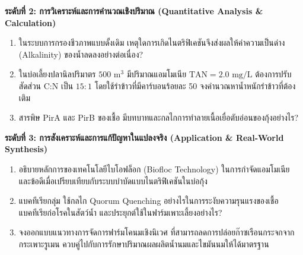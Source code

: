 \noindent \textbf{ระดับที่ 2: การวิเคราะห์และการคำนวณเชิงปริมาณ (Quantitative Analysis \& Calculation)}
\begin{enumerate}[resume]
    \item ในระบบการกรองชีวภาพแบบดั้งเดิม เหตุใดการเกิดไนตริฟิเคชันจึงส่งผลให้ค่าความเป็นด่าง (Alkalinity) ของน้ำลดลงอย่างต่อเนื่อง?
    \item ในบ่อเลี้ยงปลานิลปริมาตร $500\text{ m}^3$ มีปริมาณแอมโมเนีย $\text{TAN} = 2.0\text{ mg/L}$ ต้องการปรับสัดส่วน C:N เป็น $15:1$ โดยใช้รำข้าวที่มีคาร์บอนร้อยละ 50 จงคำนวณหาน้ำหนักรำข้าวที่ต้องเติม
    \item สารพิษ PirA และ PirB ของเชื้อ  มีบทบาทและกลไกการทำลายเนื้อเยื่อตับอ่อนของกุ้งอย่างไร?
\end{enumerate}

\noindent \textbf{ระดับที่ 3: การสังเคราะห์และการแก้ปัญหาในแปลงจริง (Application \& Real-World Synthesis)}
\begin{enumerate}[resume]
    \item อธิบายหลักการของเทคโนโลยีไบโอฟล็อก (Biofloc Technology) ในการกำจัดแอมโมเนีย และข้อดีเมื่อเปรียบเทียบกับระบบบำบัดแบบไนตริฟิเคชันในบ่อกุ้ง
    \item แบคทีเรียกลุ่ม  ใช้กลไก Quorum Quenching อย่างไรในการระงับความรุนแรงของเชื้อแบคทีเรียก่อโรคในสัตว์น้ำ และประยุกต์ใช้ในฟาร์มเพาะเลี้ยงอย่างไร?
    \item จงออกแบบแนวทางการจัดการฟาร์มโคนมเชิงนิเวศ ที่สามารถลดการปล่อยก๊าซเรือนกระจกจากกระเพาะรูเมน ควบคู่ไปกับการรักษาปริมาณผลผลิตน้ำนมและไขมันนมให้ได้มาตรฐาน
\end{enumerate}
